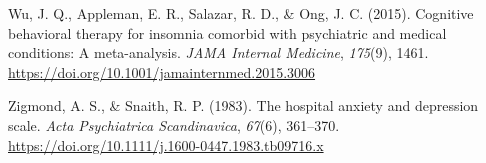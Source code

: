 \documentclass[
  english,
  man]{apa6}
\newlength{\cslhangindent}
\newenvironment{CSLReferences}[2] %
 {\begin{list}{}{%
  \setlength{\itemindent}{0pt}
  \setlength{\leftmargin}{0pt}
  \setlength{\parsep}{0pt}
  \ifodd #1
   \setlength{\leftmargin}{\cslhangindent}
   \setlength{\itemindent}{-1\cslhangindent}
  \fi
  \setlength{\itemsep}{#2\baselineskip}}}
 {\end{list}}
\begin{document}
\begin{CSLReferences}{1}{0}
Wu, J. Q., Appleman, E. R., Salazar, R. D., \& Ong, J. C. (2015). Cognitive behavioral therapy for insomnia comorbid with psychiatric and medical conditions: A meta-analysis. \emph{JAMA Internal Medicine}, \emph{175}(9), 1461. \url{https://doi.org/10.1001/jamainternmed.2015.3006}

Zigmond, A. S., \& Snaith, R. P. (1983). The hospital anxiety and depression scale. \emph{Acta Psychiatrica Scandinavica}, \emph{67}(6), 361--370. \url{https://doi.org/10.1111/j.1600-0447.1983.tb09716.x}

\end{CSLReferences}
\end{document}

